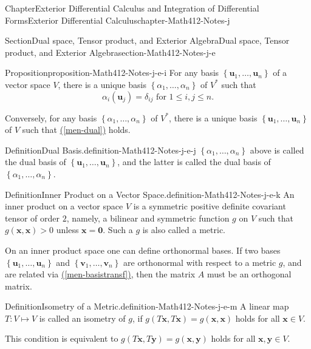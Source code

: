 \documentclass[oneside,10pt,]{book}
\newcommand{\xreffont}{\relax}
\numberwithin{equation}{section}
\begin{document}
\begin{chapterptx}{Chapter}{Exterior Differential Calculus and Integration of Differential Forms}{}{Exterior Differential Calculus}{}{}{chapter-Math412-Notes-j}
\begin{sectionptx}{Section}{Dual space, Tensor product, and Exterior Algebra}{}{Dual space, Tensor product, and Exterior Algebra}{}{}{section-Math412-Notes-j-e}
\begin{proposition}{Proposition}{}{}{proposition-Math412-Notes-j-e-i}%
For any basis \(\left\{ {\mathbf u}_{1}, \ldots, {\mathbf u}_{n}\right\}\) of a vector space \(V\), there is a unique basis \(\left\{\alpha_{1},\ldots, \alpha_{n}\right\}\) of \(V^{*}\) such that%
\begin{equation}
\alpha_{i}({\mathbf u}_{j})=\delta_{ij} \text{ for } 1\le i, j \le n.\label{men-dual}
\end{equation}
%
\par
Conversely, for any basis \(\left\{\alpha_{1},\ldots, \alpha_{n}\right\}\) of \(V^{*}\), there is a unique basis \(\left\{ {\mathbf u}_{1}, \ldots, {\mathbf u}_{n}\right\}\) of \(V\) such that \hyperref[men-dual]{({\xreffont\ref{men-dual}})} holds.%
\end{proposition}
\begin{definition}{Definition}{Dual Basis.}{definition-Math412-Notes-j-e-j}%
\(\left\{\alpha_{1},\ldots, \alpha_{n}\right\}\) above is called the dual basis of \(\left\{ {\mathbf u}_{1}, \ldots, {\mathbf u}_{n}\right\}\), and the latter is called the dual basis of \(\left\{\alpha_{1},\ldots, \alpha_{n}\right\}\).%
\end{definition}
\begin{definition}{Definition}{Inner Product on a Vector Space.}{definition-Math412-Notes-j-e-k}%
An inner product on a vector space \(V\) is a symmetric positive definite covariant tensor of order \(2\), namely, a bilinear and symmetric function \(g\) on  \(V\) such that \(g({\mathbf x}, {\mathbf x})>0\) unless \({\mathbf x}={\mathbf 0}\).  Such a \(g\) is also called a metric.%
\end{definition}
On an inner product space one can define orthonormal bases. If two bases \(\left\{ {\mathbf u}_{1}, \ldots, {\mathbf u}_{n}\right\}\) and \(\left\{ {\mathbf v}_{1}, \ldots, {\mathbf v}_{n}\right\}\) are orthonormal with respect to a metric \(g\), and are related via \hyperref[men-basistransf]{({\xreffont\ref{men-basistransf}})}, then the matrix \(A\) must be an orthogonal matrix.%
\begin{definition}{Definition}{Isometry of a Metric.}{definition-Math412-Notes-j-e-m}%
A linear map \(T: V\mapsto V\) is called an isometry of \(g\), if \(g(T {\mathbf x}, T {\mathbf x})=g({\mathbf x}, {\mathbf x}) \) holds for all \({\mathbf x} \in V\).%
\end{definition}
This condition is equivalent to \(g(T {\mathbf x}, T {\mathbf y})=g({\mathbf x}, {\mathbf y}) \) holds for all \({\mathbf x}, {\mathbf y} \in V\).%

\end{sectionptx}
\end{chapterptx}
\end{document}
